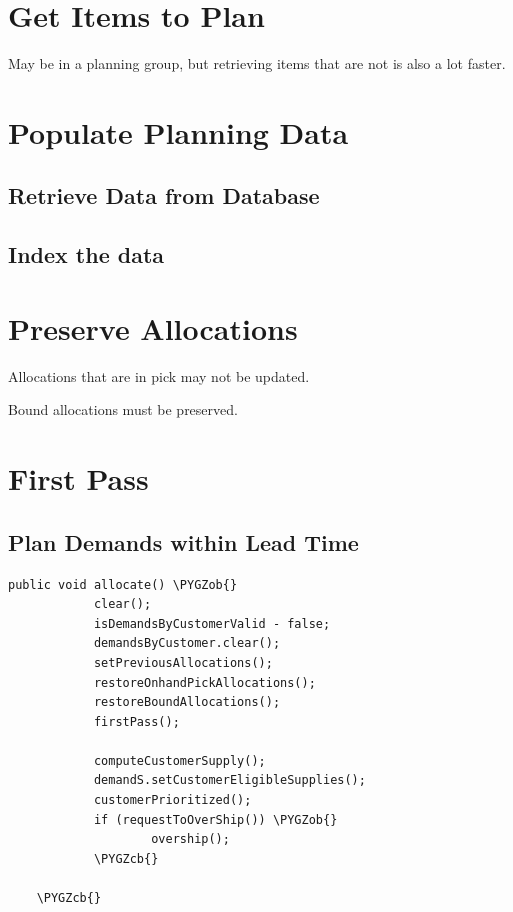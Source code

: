\documentclass[letterpaper,10pt,english]{sphinxmanual}
\def\PYGZob{\char`\{}
\def\PYGZcb{\char`\}}
\begin{document}
\section{Get Items to Plan}
\label{APS/PlanningComponentsPaper:get-items-to-plan}
May be in a planning group, but retrieving items that are not is also a
lot faster.


\section{Populate Planning Data}
\label{APS/PlanningComponentsPaper:populate-planning-data}

\subsection{Retrieve Data from Database}
\label{APS/PlanningComponentsPaper:retrieve-data-from-database}

\subsection{Index the data}
\label{APS/PlanningComponentsPaper:index-the-data}

\section{Preserve Allocations}
\label{APS/PlanningComponentsPaper:preserve-allocations}
Allocations that are in pick may not be updated.

Bound allocations must be preserved.


\section{First Pass}
\label{APS/PlanningComponentsPaper:first-pass}

\subsection{Plan Demands within Lead Time}
\label{APS/PlanningComponentsPaper:plan-demands-within-lead-time}
\begin{Verbatim}[commandchars=\\\{\}]
public void allocate() \PYGZob{}
            clear();
            isDemandsByCustomerValid - false;
            demandsByCustomer.clear();
            setPreviousAllocations();
            restoreOnhandPickAllocations();
            restoreBoundAllocations();
            firstPass();

            computeCustomerSupply();
            demandS.setCustomerEligibleSupplies();
            customerPrioritized();
            if (requestToOverShip()) \PYGZob{}
                    overship();
            \PYGZcb{}

    \PYGZcb{}
\end{Verbatim}
\end{document}

